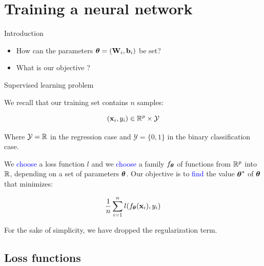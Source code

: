 \documentclass[xcolor=pdftex,dvipsnames,table,mathserif,aspectratio=169]{beamer}
\begin{document}
\section{Training a neural network}

\begin{frame}{Introduction}

  \begin{itemize}
  \item How can the parameters $\boldsymbol{\theta} = (\mathbf{W}_i, \mathbf{b}_i)$  be set?
  \item What is our objective ?
  \end{itemize}

\end{frame}


\begin{frame}{Supervised learning problem}

  We recall that our training set contains $n$ samples:

  \[
  (\mathbf{x}_i, y_i) \in \mathbb{R}^p \times \mathcal{Y}
  \]

  Where $\mathcal{Y}=\mathbb{R}$ in the regression case and $\mathcal{Y}=\{0, 1\}$ in the binary classification case.

  \pause

  We \textcolor{blue}{choose} a loss function $l$ and we \textcolor{blue}{choose} a family $f_{\boldsymbol{\theta}}$
  of functions from $\mathbb{R}^p$ into $\mathbb{R}$,
  depending on a set of parameters $\boldsymbol{\theta}$. Our objective is to \textcolor{blue}{find} the value $\boldsymbol{\theta} ^{\ast}$ of $\boldsymbol{\theta}$
  that minimizes:

  \[
  \frac{1}{n} \sum\limits_{i=1}^{n}   l (f_{\boldsymbol{\theta}}(\mathbf{x}_i), y_i)
  \]

  \vspace{1em}

  \pause

  \small{For the sake of simplicity, we have dropped the regularization term.}

\end{frame}


\subsection{Loss functions}
\end{document}
